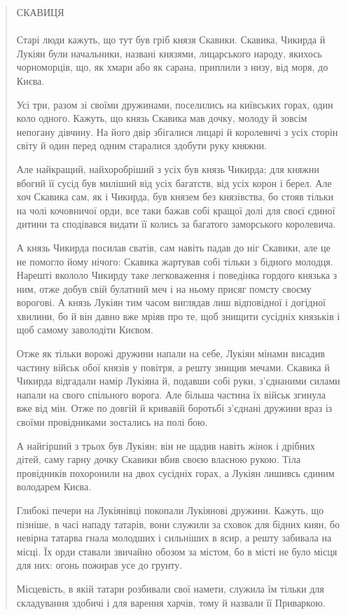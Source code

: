 \begin{quotation}
СКАВИЦЯ
\\
\\
Старі люди кажуть, що тут був гріб князя Скавики. Скавика, Чикирда й Лукіян були начальники, названі князями, лицарського народу, якихось чорноморців, що, як хмари або як сарана, приплили з низу, від моря, до Києва. 

Усі три, разом зі своїми дружинами, поселились на київських горах, один коло одного. Кажуть, що князь Скавика мав дочку, молоду й зовсім непогану дівчину. На його двір збігалися лицарі й королевичі з усіх сторін світу й один перед одним старалися здобути руку княжни. 

Але найкращий, найхоробріший з усіх був князь Чикирда; для княжни вбогий її сусід був миліший від усіх багатств, від усіх корон і берел. Але хоч Скавика сам, як і Чикирда, був князем без князівства, бо стояв тільки на чолі кочовничої орди, все таки бажав собі кращої долі для своєї єдиної дитини та сподівався видати її колись за багатого заморського королевича.

А князь Чикирда посилав сватів, сам навіть падав до ніг Скавики, але це не помогло йому нічого: Скавика жартував собі тільки з бідного молодця. Нарешті вкололо Чикирду таке легковаження і поведінка гордого князька з ним, отже добув свій булатний меч і на ньому присяг помсту своєму ворогові. А князь Лукіян тим часом виглядав лиш відповідної і догідної хвилини, бо й він давно вже мріяв про те, щоб знищити сусідніх князьків і щоб самому заволодіти Києвом. 

Отже як тільки ворожі дружини напали на себе, Лукіян мінами висадив частину військ обої князів у повітря, а решту знищив мечами. Скавика й Чикирда відгадали намір Лукіяна й, подавши собі руки, з'єднаними силами напали на свого спільного ворога. Але більша частина їх військ згинула вже від мін. Отже по довгій й кривавій боротьбі з'єднані дружини враз із своїми провідниками зостались на полі бою.

А найгірший з трьох був Лукіян; він не щадив навіть жінок і дрібних дітей, саму гарну дочку Скавики вбив своєю власною рукою. Тіла провідників похоронили на двох сусідніх горах, а Лукіян лишивсь єдиним володарем Києва.

Глибокі печери на Лукіянівці покопали Лукі\-янові дружини. Кажуть, що пізніше, в часі нападу татарів, вони служили за сховок для бідних киян, бо невірна татарва гнала молодших і сильніших в ясир, а решту забивала на місці. Їх орди ставали звичайно обозом за містом, бо в місті не було місця для них: огонь пожирав усе до грунту. 

Місцевість, в якій татари розбивали свої намети, служила їм тільки для складування здобичі і для варення харчів, тому й назвали її Приваркою.
\end{quotation}

